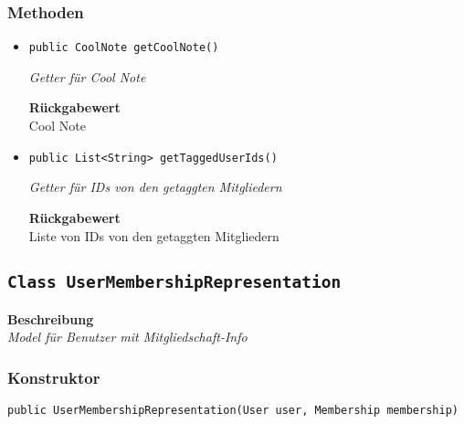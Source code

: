     \subsubsection{Methoden}
    \begin{itemize}
    	\item{\texttt{public CoolNote getCoolNote()}}
    	
    	\textit{Getter für Cool Note}
    	
    	
    	
    	\textbf{Rückgabewert} \\
    	Cool Note        \item{\texttt{public List<String> getTaggedUserIds()}}
    	
    	\textit{Getter für IDs von den getaggten Mitgliedern}
    	
    	
    	
    	\textbf{Rückgabewert} \\
    	Liste von IDs von den getaggten Mitgliedern
    \end{itemize}
    \subsection{\texttt{Class UserMembershipRepresentation}}
    \textbf{Beschreibung} \\
    \textit{Model für Benutzer mit Mitgliedschaft-Info}
    \subsubsection{Konstruktor}
    \texttt{public UserMembershipRepresentation(User user, Membership membership)}
